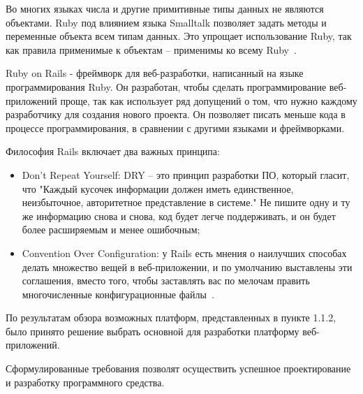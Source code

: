 Во многих языках числа и другие примитивные типы данных не являются объектами. Ruby под влиянием языка Smalltalk
позволяет задать методы и переменные объекта всем типам данных. Это упрощает использование Ruby, так как правила
применимые к объектам -- применимы ко всему Ruby~\cite{ruby}.

Ruby on Rails - фреймворк для веб-разработки, написанный на языке программирования Ruby. Он разработан, чтобы сделать
программирование веб-приложений проще, так как использует ряд допущений о том, что нужно каждому разработчику для
создания нового проекта. Он позволяет писать меньше кода в процессе программирования, в сравнении с другими языками и
фреймворками.

Философия Rails включает два важных принципа:

\begin{itemize}
	\item Don't Repeat Yourself: DRY -- это принцип разработки ПО, который гласит, что "Каждый кусочек информации должен
	иметь единственное, неизбыточное, авторитетное представление в системе." Не пишите одну и ту же информацию снова и
	снова, код будет легче поддерживать, и он будет более расширяемым и менее ошибочным;
	\item Convention Over Configuration: у Rails есть мнения о наилучших способах делать множество вещей в веб-приложении,
	и по умолчанию выставлены эти соглашения, вместо того, чтобы заставлять вас по мелочам править многочисленные
	конфигурационные файлы~\cite{rails}.
\end{itemize}

По результатам обзора возможных платформ, представленных в пункте 1.1.2, было принято решение выбрать основной для
разработки платформу веб-приложений.

Сформулированные требования позволят осуществить успешное проектирование и разработку программного средства.
